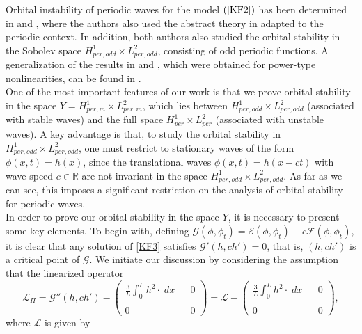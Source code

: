 \documentclass[12pt,reqno,a4paper]{amsart} %
\numberwithin{equation}{section}
\numberwithin{figure}{section}
\begin{document}
\indent Orbital instability of periodic waves for the model $(\ref{KF2})$ has been determined  in \cite{loreno} and \cite{palacios}, where the authors also used the abstract theory in \cite{grillakis1} adapted to the periodic context. In addition, both authors also studied the orbital stability in the Sobolev space $H_{per,odd}^1\times L_{per,odd}^2$, consisting of odd periodic functions. A generalization of the results in \cite{loreno} and \cite{palacios}, which were obtained for power-type nonlinearities, can be found in \cite{chenpala}.\\
\indent One of the most important features of our work is that we prove orbital stability in the space $Y=H_{per,m}^1\times L_{per,m}^2$, which lies between $H_{per,odd}^1\times L_{per,odd}^2$ (associated with stable waves) and the full space $H_{per}^1\times L_{per}^2$ (associated with unstable waves). A key advantage is that, to study the orbital stability in $H_{per,odd}^1\times L_{per,odd}^2$, one must restrict to stationary waves of the form $\phi(x,t)=h(x)$, since the translational waves $\phi(x,t)=h(x-ct)$ with wave speed $c\in \mathbb{R}$ are not invariant in the space $H_{per,odd}^1\times L_{per,odd}^2$. As far as we can see, this imposes a significant restriction on the analysis of orbital stability for periodic waves.\\
\indent In order to prove our orbital stability in the space $Y$, it is necessary to present some key elements. To begin with, defining
$\mathcal{G}(\phi, \phi_t)=\mathcal{E}(\phi, \phi_t)-c\mathcal{F}(\phi, \phi_t),$ it is clear that any solution of \eqref{KF3} satisfies $\mathcal{G}'(h,ch')=0$, that is, $(h,ch')$ is a critical point of $\mathcal{G}$. We initiate our discussion by considering the assumption that the linearized operator
\begin{equation}\displaystyle\label{opconstrained2}\mathcal{L}_{\Pi}= \mathcal{G}''(h,ch')-\displaystyle \left(
\displaystyle	\begin{array}{ccc}
		\frac{3}{L}\int_{0}^{L} h^2 \cdot \; dx& & 0 \\\\
		0  & & 0
	\end{array}\right)=\displaystyle\mathcal{L}-\displaystyle \left(
\begin{array}{ccc}
\frac{3}{L}\int_{0}^{L} h^2\cdot \; dx & & 0 \\\\
0  & & 0
\end{array}\right),\end{equation} where $\mathcal{L}$ is given by
\end{document}
